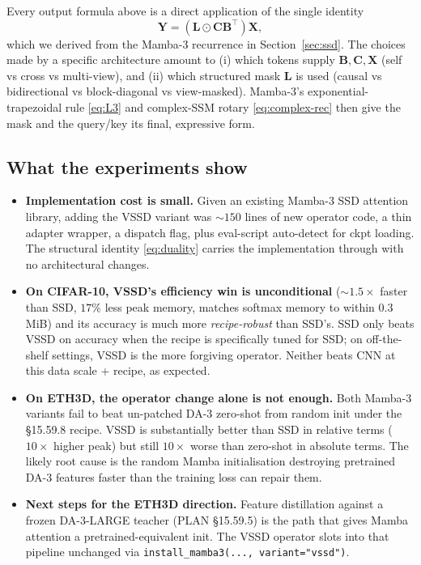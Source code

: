 \documentclass[11pt,a4paper]{article}
\begin{document}
Every output formula above is a direct application of the single
identity
\begin{equation*}
  \bm{Y} = (\bm{L}\odot\bm{C}\bm{B}^\top)\bm{X},
\end{equation*}
which we derived from the Mamba-3 recurrence in
Section~\ref{sec:ssd}. The choices made by a specific architecture
amount to (i) which tokens supply $\bm{B},\bm{C},\bm{X}$ (self vs
cross vs multi-view), and (ii) which structured mask $\bm{L}$ is used
(causal vs bidirectional vs block-diagonal vs view-masked). Mamba-3's
exponential-trapezoidal rule \eqref{eq:L3} and complex-SSM rotary
\eqref{eq:complex-rec} then give the mask and the query/key its final,
expressive form.

\subsection{What the experiments show}

\begin{itemize}
  \item \textbf{Implementation cost is small.} Given an existing
        Mamba-3 SSD attention library, adding the VSSD variant was
        $\sim 150$ lines of new operator code, a thin adapter wrapper,
        a dispatch flag, plus eval-script auto-detect for ckpt
        loading. The structural identity \eqref{eq:duality} carries
        the implementation through with no architectural changes.
  \item \textbf{On CIFAR-10, VSSD's efficiency win is unconditional}
        ($\sim 1.5\times$ faster than SSD, $17\%$ less peak memory,
        matches softmax memory to within $0.3$ MiB) and its accuracy
        is much more \emph{recipe-robust} than SSD's. SSD only
        beats VSSD on accuracy when the recipe is specifically tuned
        for SSD; on off-the-shelf settings, VSSD is the more
        forgiving operator. Neither beats CNN at this data scale +
        recipe, as expected.
  \item \textbf{On ETH3D, the operator change alone is not enough.}
        Both Mamba-3 variants fail to beat un-patched DA-3 zero-shot
        from random init under the \S15.59.8 recipe. VSSD is
        substantially better than SSD in relative terms ($10\times$
        higher peak) but still $10\times$ worse than zero-shot in
        absolute terms. The likely root cause is the random Mamba
        initialisation destroying pretrained DA-3 features faster
        than the training loss can repair them.
  \item \textbf{Next steps for the ETH3D direction.} Feature
        distillation against a frozen DA-3-LARGE teacher
        (PLAN \S15.59.5) is the path that gives Mamba attention a
        pretrained-equivalent init. The VSSD operator slots into
        that pipeline unchanged via
        \texttt{install\_\allowbreak{}mamba3(..., variant="vssd")}.
\end{itemize}



\end{document}
